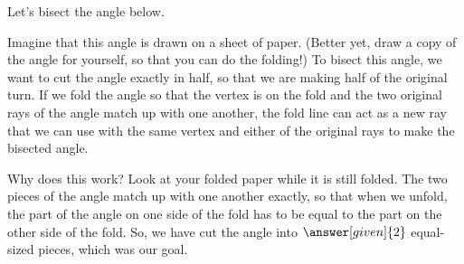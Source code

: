 \documentclass{ximera}
\begin{document}
\begin{example}
Let's bisect the angle below.
\begin{image}
\end{image}
Imagine that this angle is drawn on a sheet of paper. (Better yet, draw a copy of the angle for yourself, so that you can do the folding!) To bisect this angle, we want to cut the angle exactly in half, so that we are making half of the original turn. If we fold the angle so that the vertex is on the fold and the two original rays of the angle match up with one another, the fold line can act as a new ray that we can use with the same vertex and either of the original rays to make the bisected angle.

\begin{image}
\end{image}
Why does this work? Look at your folded paper while it is still folded. The two pieces of the angle match up with one another exactly, so that when we unfold, the part of the angle on one side of the fold has to be equal to the part on the other side of the fold. So, we have cut the angle into $\answer[given]{2}$ equal-sized pieces, which was our goal.
\end{example}
\end{document}
